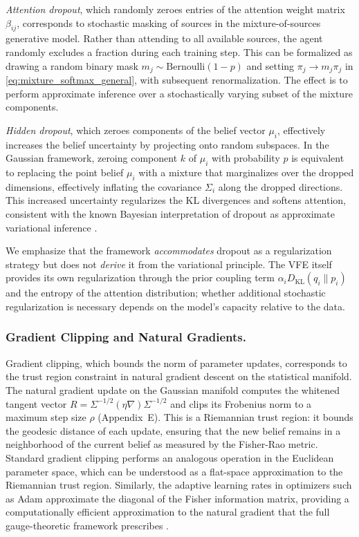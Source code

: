 \documentclass[twoside,11pt]{article}
\begin{document}
\emph{Attention dropout}, which randomly zeroes entries of the attention weight matrix $\beta_{ij}$, corresponds to stochastic masking of sources in the mixture-of-sources generative model. Rather than attending to all available sources, the agent randomly excludes a fraction during each training step. This can be formalized as drawing a random binary mask $m_j \sim \mathrm{Bernoulli}(1-p)$ and setting $\pi_j \to m_j \pi_j$ in \eqref{eq:mixture_softmax_general}, with subsequent renormalization. The effect is to perform approximate inference over a stochastically varying subset of the mixture components.

\emph{Hidden dropout}, which zeroes components of the belief vector $\mu_i$, effectively increases the belief uncertainty by projecting onto random subspaces. In the Gaussian framework, zeroing component $k$ of $\mu_i$ with probability $p$ is equivalent to replacing the point belief $\mu_i$ with a mixture that marginalizes over the dropped dimensions, effectively inflating the covariance $\Sigma_i$ along the dropped directions. This increased uncertainty regularizes the KL divergences and softens attention, consistent with the known Bayesian interpretation of dropout as approximate variational inference \citep{gal2016dropout}.

We emphasize that the framework \emph{accommodates} dropout as a regularization strategy but does not \emph{derive} it from the variational principle. The VFE itself provides its own regularization through the prior coupling term $\alpha_i D_{\mathrm{KL}}(q_i \| p_i)$ and the entropy of the attention distribution; whether additional stochastic regularization is necessary depends on the model's capacity relative to the data.

\subsubsection{Gradient Clipping and Natural Gradients.}
\label{sec:gradient_clipping}

Gradient clipping, which bounds the norm of parameter updates, corresponds to the trust region constraint in natural gradient descent on the statistical manifold. The natural gradient update on the Gaussian manifold computes the whitened tangent vector $R = \Sigma^{-1/2}(\eta \nabla)\Sigma^{-1/2}$ and clips its Frobenius norm to a maximum step size $\rho$ (Appendix~E). This is a Riemannian trust region: it bounds the geodesic distance of each update, ensuring that the new belief remains in a neighborhood of the current belief as measured by the Fisher-Rao metric. Standard gradient clipping performs an analogous operation in the Euclidean parameter space, which can be understood as a flat-space approximation to the Riemannian trust region. Similarly, the adaptive learning rates in optimizers such as Adam \citep{kingma2014adam} approximate the diagonal of the Fisher information matrix, providing a computationally efficient approximation to the natural gradient that the full gauge-theoretic framework prescribes \citep{martens2020new,amari1998natural}.
\end{document}
